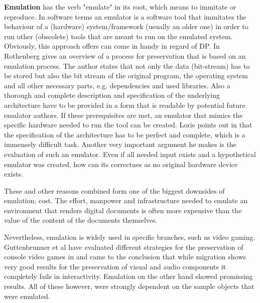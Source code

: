 \textbf{Emulation} has the verb "emulate" in its root, which means to immitate or reproduce.
In software terms an emulator is a software tool that immitates the behaviour of a (hardware) system/framework (usually an older one) in order to run other (obscolete) tools that are meant to run on the emulated system. Obviously, this approach offers can come in handy in regard of DP.
In \cite{rothenberg:1999:ensuring} Rothenberg gives an overview of a process for preservation that is based on an emulation process. The author states that not only the data (bit-stream) has to be stored but also the bit stream of the original program, the operating system and all other necessary parts, e.g. dependencies and used libraries. Also a thorough and complete description and specification of the underlying architecture have to be provided in a form that is readable by potential future emulator authors. If these prerequisites are met, an emulator that mimics the specific hardware needed to run the tool can be created.
Lorie points out in \cite{Lorie:2001:LTP:379437.379726} that the specification of the architecture has to be perfect and complete, which is a immensely difficult task. Another very important argument he makes is the evaluation of such an emulator. Even if all needed input exists and a hypothetical emulator was created, how can its correctnes as no original hardware device exists.

These and other reasons combined form one of the biggest downsides of emulation; cost. The effort, manpower and infrastructure needed to emulate an environment that renders digital documents is often more expensive than the value of the content of the documents themselves.

Nevertheless, emulation is widely used in specific branches, such as video gaming.
Guttenbrunner et al have evaluated different strategies for the preservation of console video games in \cite{guttenbrunner:2008:evaluating} and came to the conclusion that while migration shows very good results for the preservation of visual and audio components it completely fails in interactivity. Emulation on the other hand showed promissing results. All of these however, were strongly dependent on the sample objects that were emulated.

